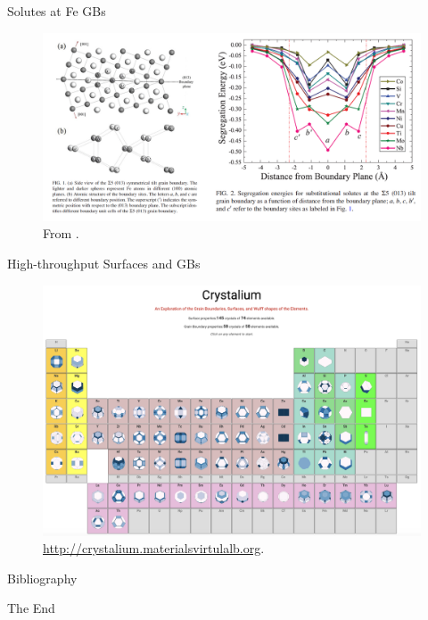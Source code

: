 \documentclass[aspectratio=169]{beamer}
\begin{document}
\begin{frame}{Solutes at Fe GBs}
\begin{figure}
    \centering
    \includegraphics[width=0.8\linewidth]{lectures/figures/11_Solutes_at_Fe_GBs.png}
    \caption{From \cite{jinStudyInteractionSolutes2014}.}
\end{figure} 
\end{frame} 


\begin{frame}{High-throughput Surfaces and GBs}
\begin{figure}
    \centering
    \includegraphics[width=0.5\linewidth]{lectures/figures/11_Crystalium.png}
    \caption{\url{http://crystalium.materialsvirtulalb.org}.\cite{tranSurfaceEnergiesElemental2016,tranAnisotropicWorkFunction2019,zhengGrainBoundaryProperties2020}}
\end{figure} 
\end{frame} 

    \begin{frame}[allowframebreaks]{Bibliography}
        
        
    \end{frame}



    \begin{frame}
        \Huge{\centerline{The End}}
    \end{frame}
\end{document}
